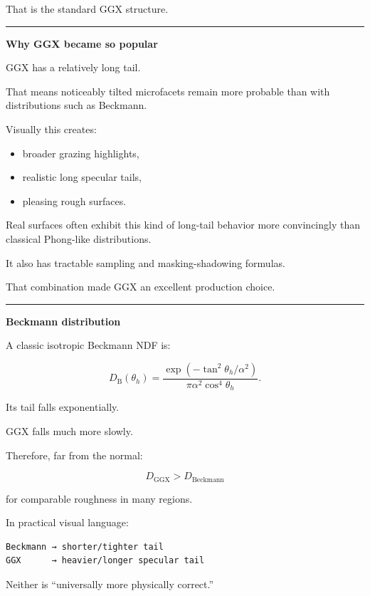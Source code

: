 That is the standard GGX structure.

\begin{center}\rule{0.5\linewidth}{0.5pt}\end{center}

\textbf{Why GGX became so popular}

GGX has a relatively long tail.

That means noticeably tilted microfacets remain more probable than with distributions such as Beckmann.

Visually this creates:

\begin{itemize}
\tightlist
\item
  broader grazing highlights,
\item
  realistic long specular tails,
\item
  pleasing rough surfaces.
\end{itemize}

Real surfaces often exhibit this kind of long-tail behavior more convincingly than classical Phong-like distributions.

It also has tractable sampling and masking-shadowing formulas.

That combination made GGX an excellent production choice.

\begin{center}\rule{0.5\linewidth}{0.5pt}\end{center}

\textbf{Beckmann distribution}

A classic isotropic Beckmann NDF is:

\[
\boxed{
D_{\mathrm B}(\theta_h)
=
\frac{
\exp\left(
-\tan^2\theta_h/\alpha^2
\right)
}{
\pi\alpha^2\cos^4\theta_h
}.
}
\]

Its tail falls exponentially.

GGX falls much more slowly.

Therefore, far from the normal:

\[
D_{\mathrm{GGX}}
>
D_{\mathrm{Beckmann}}
\]

for comparable roughness in many regions.

In practical visual language:

\begin{verbatim}
Beckmann → shorter/tighter tail
GGX      → heavier/longer specular tail
\end{verbatim}

Neither is ``universally more physically correct.''

